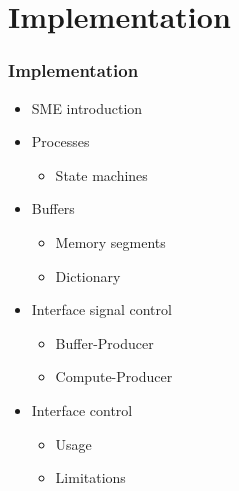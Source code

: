 \section{Implementation}
\newcommand{\ImplementationTitle}{Implementation}
\begin{frame}
    \frametitle{\ImplementationTitle}
    \centering
    \begin{minipage}{1\textwidth}
        \begin{itemize}%
            \item SME introduction
            \item Processes
            \begin{itemize}
                \item State machines
            \end{itemize}
            \item Buffers
            \begin{itemize}
                \item Memory segments
                \item Dictionary
            \end{itemize}
            \item Interface signal control
            \begin{itemize}
                \item Buffer-Producer
                \item Compute-Producer
            \end{itemize}
            \item Interface control
            \begin{itemize}
                \item Usage
                \item Limitations
            \end{itemize}
        \end{itemize}
    \end{minipage}
\end{frame}

